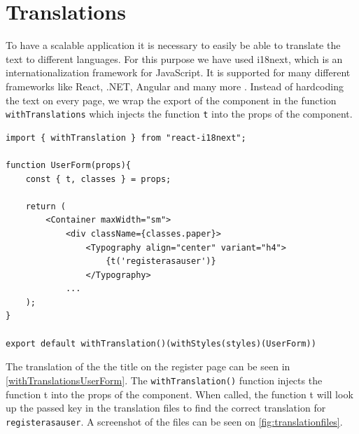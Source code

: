 \section{Translations}
To have a scalable application it is necessary to easily be able to translate the text to different languages.
For this purpose we have used i18next, which is an internationalization framework for JavaScript.
It is supported for many different frameworks like React, .NET, Angular and many more \cite{i18next}.
Instead of hardcoding the text on every page, we wrap the export of the component in the function \texttt{withTranslations} which injects the function \texttt{t} into the props of the component.  

\begin{lstlisting}[caption={Translated header when registering as a user.}, captionpos=b, label={withTranslationsUserForm}]
import { withTranslation } from "react-i18next";

function UserForm(props){
    const { t, classes } = props;

    return (
        <Container maxWidth="sm">
            <div className={classes.paper}>
                <Typography align="center" variant="h4">
                    {t('registerasauser')}
                </Typography>
            ...
    );
}

export default withTranslation()(withStyles(styles)(UserForm))
\end{lstlisting}
\noindent
The translation of the the title on the register page can be seen in \autoref{withTranslationsUserForm}.
The \texttt{withTranslation()} function injects the function t into the props of the component.
When called, the function t will look up the passed key in the translation files to find the correct translation for \texttt{registerasauser}. 
A screenshot of the files can be seen on \autoref{fig:translationfiles}.

